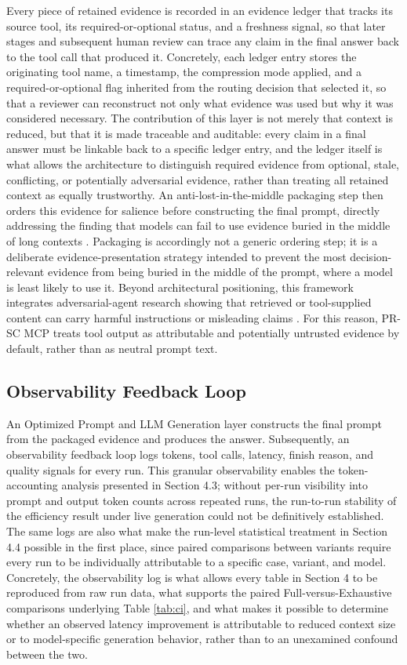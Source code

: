 Every piece of retained evidence is recorded in an evidence ledger that tracks its source tool, its required-or-optional status, and a freshness signal, so that later stages and subsequent human review can trace any claim in the final answer back to the tool call that produced it. Concretely, each ledger entry stores the originating tool name, a timestamp, the compression mode applied, and a required-or-optional flag inherited from the routing decision that selected it, so that a reviewer can reconstruct not only what evidence was used but why it was considered necessary. The contribution of this layer is not merely that context is reduced, but that it is made traceable and auditable: every claim in a final answer must be linkable back to a specific ledger entry, and the ledger itself is what allows the architecture to distinguish required evidence from optional, stale, conflicting, or potentially adversarial evidence, rather than treating all retained context as equally trustworthy. An anti-lost-in-the-middle packaging step then orders this evidence for salience before constructing the final prompt, directly addressing the finding that models can fail to use evidence buried in the middle of long contexts \cite{Liu2024a}. Packaging is accordingly not a generic ordering step; it is a deliberate evidence-presentation strategy intended to prevent the most decision-relevant evidence from being buried in the middle of the prompt, where a model is least likely to use it. Beyond architectural positioning, this framework integrates adversarial-agent research showing that retrieved or tool-supplied content can carry harmful instructions or misleading claims \cite{Greshake2023, Zhan2024, Radosevich2025}. For this reason, PR-SC MCP treats tool output as attributable and potentially untrusted evidence by default, rather than as neutral prompt text.

\subsection{Observability Feedback Loop}

An Optimized Prompt and LLM Generation layer constructs the final prompt from the packaged evidence and produces the answer. Subsequently, an observability feedback loop logs tokens, tool calls, latency, finish reason, and quality signals for every run. This granular observability enables the token-accounting analysis presented in Section 4.3; without per-run visibility into prompt and output token counts across repeated runs, the run-to-run stability of the efficiency result under live generation could not be definitively established. The same logs are also what make the run-level statistical treatment in Section 4.4 possible in the first place, since paired comparisons between variants require every run to be individually attributable to a specific case, variant, and model. Concretely, the observability log is what allows every table in Section 4 to be reproduced from raw run data, what supports the paired Full-versus-Exhaustive comparisons underlying Table \ref{tab:ci}, and what makes it possible to determine whether an observed latency improvement is attributable to reduced context size or to model-specific generation behavior, rather than to an unexamined confound between the two.

